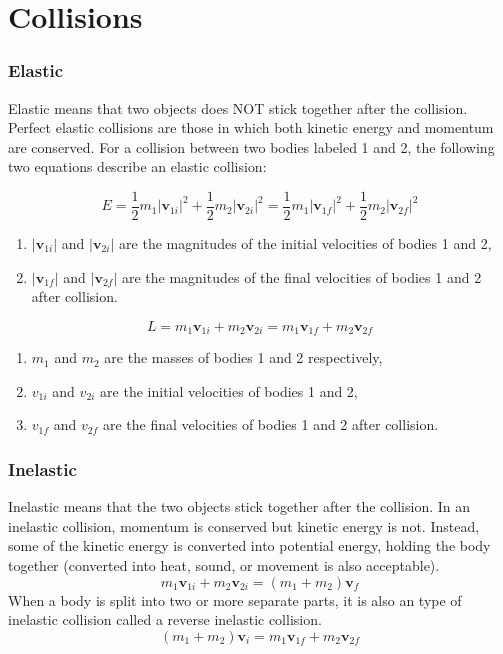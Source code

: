 \documentclass[]{article}
\begin{document}
\section{Collisions}
\subsubsection{Elastic}
Elastic means that two objects does NOT stick together after the collision. Perfect elastic collisions are those in which both kinetic energy and momentum are conserved. For a collision between two bodies labeled 1 and 2, the following two equations describe an elastic collision:

$$E = \frac{1}{2} m_1 |\mathbf{v}_{1i}|^2 + \frac{1}{2} m_2 |\mathbf{v}_{2i}|^2 = \frac{1}{2} m_1 |\mathbf{v}_{1f}|^2 + \frac{1}{2} m_2 |\mathbf{v}_{2f}|^2$$

\begin{enumerate}
	\item $|\mathbf{v}_{1i}|$ and $|\mathbf{v}_{2i}|$ are the magnitudes of the initial velocities of bodies 1 and 2,

	\item $|\mathbf{v}_{1f}|$ and $|\mathbf{v}_{2f}|$ are the magnitudes of the final velocities of bodies 1 and 2 after collision.

\end{enumerate}
$$L = m_1 \mathbf{v}_{1i} + m_2 \mathbf{v}_{2i} = m_1 \mathbf{v}_{1f} + m_2 \mathbf{v}_{2f}$$

\begin{enumerate}
\item $m_1$ and $m_2$ are the masses of bodies 1 and 2 respectively,

\item $v_{1i}$ and $v_{2i}$ are the initial velocities of bodies 1 and 2,

\item $v_{1f}$ and $v_{2f}$ are the final velocities of bodies 1 and 2 after collision.
  
\end{enumerate}
\subsubsection{Inelastic}
Inelastic means that the two objects stick together after the collision. In an inelastic collision, momentum is conserved but kinetic energy is not. Instead, some of the kinetic energy is converted into potential energy, holding the body together (converted into heat, sound, or movement is also acceptable).
$$m_1 \mathbf{v}_{1i} + m_2 \mathbf{v}_{2i} = (m_1 +m_2)\mathbf{v}_{f}$$
When a body is split into two or more separate parts, it is also an type of inelastic collision called a  reverse inelastic collision. 
$$(m_1 +m_2)\mathbf{v}_{i} = m_1 \mathbf{v}_{1f} + m_2 \mathbf{v}_{2f} $$
\end{document}
